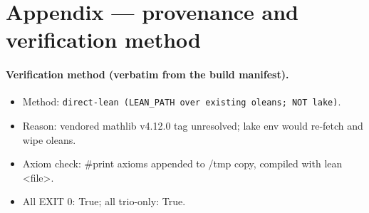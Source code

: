\documentclass[11pt]{article}
\begin{document}
\section{Appendix --- provenance and verification method}
\label{sec:appendix}

\paragraph{Verification method (verbatim from the build manifest).}
\begin{itemize}
  \item Method: \texttt{direct-lean (LEAN\_PATH over existing oleans; NOT lake)}.
  \item Reason: vendored mathlib v4.12.0 tag unresolved; lake env would re-fetch and wipe oleans.
  \item Axiom check: \#print axioms appended to /tmp copy, compiled with lean <file>.
  \item All EXIT 0: True; all trio-only: True.
\end{itemize}
\end{document}
